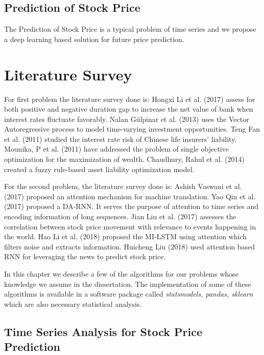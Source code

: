 	\subsection{Prediction of Stock Price}

		The Prediction of Stock Price is a typical problem of time series and we propose a deep learning based solution for future price prediction.

\section{Literature Survey}

	For first problem the literature survey done is: Hongxi Li et al. (2017) assess for both positive and negative duration gap to increase the net value of bank when interest rates fluctuate favorably\cite{4}. Nalan Gülpinar et al. (2013) uses the Vector Autoregressive process to model time-varying investment opportunities\cite{3}. Teng Fan et al. (2011) studied the interest rate risk of Chinese life insurers’ liability\cite{1}. Mounika, P et al. (2011) have addressed the problem of single objective optimization for the maximization of wealth\cite{16}. Chaudhury, Rahul et al. (2014) created a fuzzy rule-based asset liability optimization model\cite{17}.

	For the second problem, the literature survey done is: Ashish Vaswani et al. (2017) proposed an attention mechanism for machine translation\cite{2}. Yao Qin et al. (2017) proposed a DA-RNN. It serves the purpose of attention to time series and encoding information of long sequences\cite{6}. Jian Liu et al. (2017) assesses the correlation between stock price movement with relevance to events happening in the world\cite{7}. Hao Li et al. (2018) proposed the MI-LSTM using attention which filters noise and extracts information\cite{8}. Huicheng Liu (2018) used attention based RNN for leveraging the news to predict stock price\cite{9}.

In this chapter we describe a few of the algorithms for our problems whose knowledge we assume  in the dissertation. The implementation of some of these  algorithms is available in a software package called \emph{statsmodels, pandas, sklearn} \cite{5} \cite{12} which are also necessary statistical analysis.



\subsection{Time Series Analysis for Stock Price Prediction}

